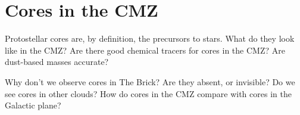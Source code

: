 \section{Cores in the CMZ}
Protostellar cores are, by definition, the precursors to stars.  What do they look like in the CMZ?  Are there good chemical tracers for cores in the CMZ?  Are dust-based masses accurate?  

Why don't we observe cores in The Brick?  Are they absent, or invisible?  Do we see cores in other clouds?  How do cores in the CMZ compare with cores in the Galactic plane?

